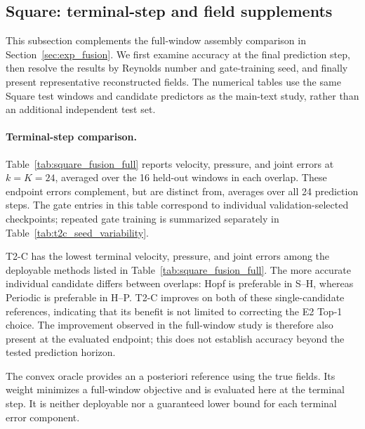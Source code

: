 \subsection{Square: terminal-step and field supplements}
\label{app:square_terminal}

This subsection complements the full-window assembly comparison in
Section~\ref{sec:exp_fusion}. We first examine accuracy at the final
prediction step, then resolve the results by Reynolds number and
gate-training seed, and finally present representative reconstructed
fields. The numerical tables use the same Square test windows and
candidate predictors as the main-text study, rather than an additional
independent test set.

\paragraph{Terminal-step comparison.}
Table~\ref{tab:square_fusion_full} reports velocity, pressure, and joint
errors at $k=K=24$, averaged over the 16 held-out windows in each overlap.
These endpoint errors complement, but are distinct from, averages over
all 24 prediction steps. The gate entries in this table correspond
to individual validation-selected checkpoints; repeated gate training
is summarized separately in Table~\ref{tab:t2c_seed_variability}.

T2-C has the lowest terminal velocity, pressure, and joint errors among
the deployable methods listed in Table~\ref{tab:square_fusion_full}.
The more accurate individual candidate differs between overlaps:
Hopf is preferable in S--H, whereas Periodic is preferable in H--P.
T2-C improves on both of these single-candidate references, indicating
that its benefit is not limited to correcting the E2 Top-1 choice.
The improvement observed in the full-window study is therefore also
present at the evaluated endpoint; this does not establish accuracy
beyond the tested prediction horizon.

The convex oracle provides an a posteriori reference using the true
fields. Its weight minimizes a full-window objective and is evaluated
here at the terminal step. It is neither deployable nor a guaranteed
lower bound for each terminal error component.

